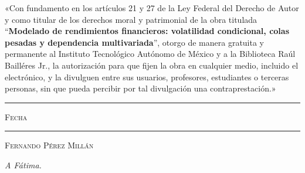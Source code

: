 \documentclass[11pt, oneside]{book}
\newcommand{\thesisbib}{../../biblo}
\numberwithin{equation}{chapter}
\numberwithin{table}{chapter}
\newcounter{physpage}
\renewcommand{\cleardoublepage}{%
  \clearpage
  \ifodd\value{physpage}%
    \thispagestyle{empty}\mbox{}\clearpage
  \fi
}
\begin{document}
\cleardoublepage


\thispagestyle{empty}

\vspace*{\fill}
\begingroup

\noindent
«Con fundamento en los artículos 21 y 27 de la Ley Federal del Derecho de Autor y como titular de los derechos moral y patrimonial de la obra titulada ``\textbf{Modelado de rendimientos financieros: volatilidad condicional, colas pesadas y dependencia multivariada}'', otorgo de manera gratuita y permanente al Instituto Tecnológico Autónomo de México y a la Biblioteca Raúl Bailléres Jr., la autorización para que fijen la obra en cualquier medio, incluido el electrónico, y la divulguen entre sus usuarios, profesores, estudiantes o terceras personas, sin que pueda percibir por tal divulgación una contraprestación.»


\centering 

\vspace{5em}

\rule[1em]{20em}{0.5pt} %

\textsc{Fecha}
 
\vspace{8em}

\rule[1em]{20em}{0.5pt} %

\textsc{Fernando Pérez Millán}

\endgroup
\vspace*{\fill}

\pagestyle{plain}
\frontmatter
\begin{flushright}
\textit{A Fátima.}
\end{flushright}

\tableofcontents
\mainmatter

\newpage

\newpage

\newpage

\newpage

\newpage

\newpage

\cleardoublepage
\backmatter

\end{document}
